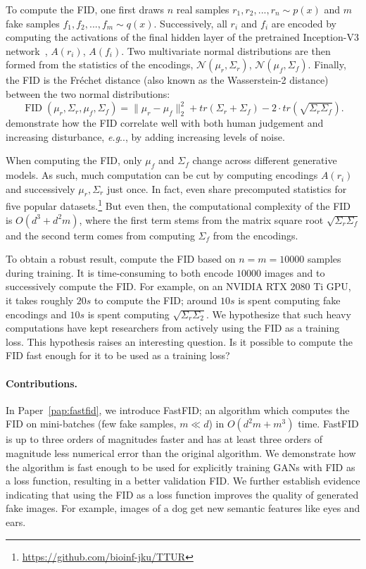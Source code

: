 \documentclass[11pt,a4paper,twoside,openright,final]{memoir}
\makeatletter
\DeclareRobustCommand\onedot{\futurelet\@let@token\@onedot}
\def\@onedot{\ifx\@let@token.\else.\null\fi\xspace}
\def\eg{\emph{e.g}\onedot} \def\Eg{\emph{E.g}\onedot}
\newcommand*{\paperref}[1]{Paper~\hyperref[#1]{\ref{#1}}}
\makeatother
\begin{document}
To compute the FID, one first draws $n$ real samples $r_1, r_2, ..., r_n \sim p(x)$ and $m$ fake samples $f_1, f_2, ..., f_m\sim q(x)$.
Successively, all $r_i$ and $f_i$ are encoded by computing the activations of the final hidden layer of the pretrained Inception-V3 network~\cite{inceptionv3}, $A(r_i)$, $A(f_i)$.
Two multivariate normal distributions are then formed from the statistics of the encodings, $\mathcal{N}(\mu_r, \Sigma_r)$, $\mathcal{N}(\mu_f, \Sigma_f)$.
Finally, the FID is the Fr\'echet distance (also known as the Wasserstein-2 distance) between the two normal distributions:
\begin{equation}\label{eq:fid}
    \operatorname{FID}(\mu_r, \Sigma_r, \mu_f, \Sigma_f) = \| \mu_r - \mu_f \|_2^2 + tr(\Sigma_r + \Sigma_f) - 2\cdot tr(\sqrt{\Sigma_r \Sigma_f}).
\end{equation}
\citet{fid} demonstrate how the FID correlate well with both human judgement and increasing disturbance, \eg, by adding increasing levels of noise. 

When computing the FID, only $\mu_f$ and $\Sigma_f$ change across different generative models.
As such, much computation can be cut by computing encodings $A(r_i)$ and successively $\mu_r, \Sigma_r$ just once.
In fact, \citet{fid} even share precomputed statistics for five popular datasets.\footnote{\url{https://github.com/bioinf-jku/TTUR}}
But even then, the computational complexity of the FID is $O(d^3 + d^2m)$, where the first term stems from the matrix square root $\sqrt{\Sigma_r\Sigma_f}$ and the second term comes from computing $\Sigma_f$ from the encodings.

To obtain a robust result, \citet{fid} compute the FID based on $n=m=10 000$ samples during training.
It is time-consuming to both encode $10 000$ images and to successively compute the FID.
For example, on an NVIDIA RTX 2080 Ti GPU, it takes roughly $20s$ to compute the FID; around $10s$ is spent computing fake encodings and $10s$ is spent computing $\sqrt{\Sigma_r\Sigma_2}$.
We hypothesize that such heavy computations have kept researchers from actively using the FID as a training loss. 
This hypothesis raises an interesting question. 
Is it possible to compute the FID fast enough for it to be used as a training loss?

\paragraph{Contributions.} 
In \paperref{pap:fastfid}, we introduce FastFID; an algorithm which computes the FID on mini-batches (few fake samples, $m \ll d$) in $O(d^2m + m^3)$ time. 
FastFID is up to three orders of magnitudes faster and has at least three orders of magnitude less numerical error than the original algorithm.
We demonstrate how the algorithm is fast enough to be used for explicitly training GANs with FID as a loss function, resulting in a better validation FID. 
We further establish evidence indicating that using the FID as a loss function improves the quality of generated fake images.
For example, images of a dog get new semantic features like eyes and ears. 
\end{document}
